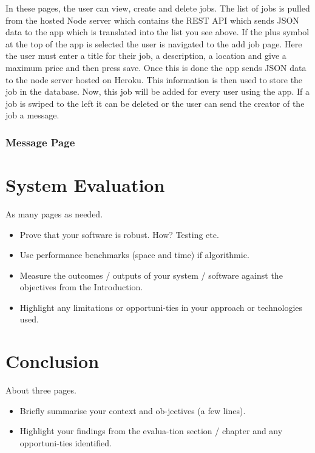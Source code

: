 In these pages, the user can view, create and delete jobs. The list of jobs is pulled from the hosted Node server which contains the REST API which sends JSON data to the app which is translated into the list you see above. If the plus symbol at the top of the app is selected the user is navigated to the add job page. Here the user must enter a title for their job, a description, a location and give a maximum price and then press save. Once this is done the app sends JSON data to the node server hosted on Heroku. This information is then used to store the job in the database. Now, this job will be added for every user using the app. If a job is swiped to the left it can be deleted or the user can send the creator of the job a message.
\subsection{Message Page}
















\chapter{System Evaluation}
As many pages as needed.
\begin{itemize}
\item Prove that your software is robust. How? Testing etc. 
\item Use performance benchmarks (space and time) if algorithmic.
\item Measure the outcomes / outputs of your system / software against the objectives from the Introduction.
\item Highlight any limitations or opportuni-ties in your approach or technologies used.
\end{itemize}

\chapter{Conclusion}
About three pages.

\begin{itemize}
\item Briefly summarise your context and ob-jectives (a few lines).
\item Highlight your findings from the evalua-tion section / chapter and any opportuni-ties identified.
\end{itemize}


